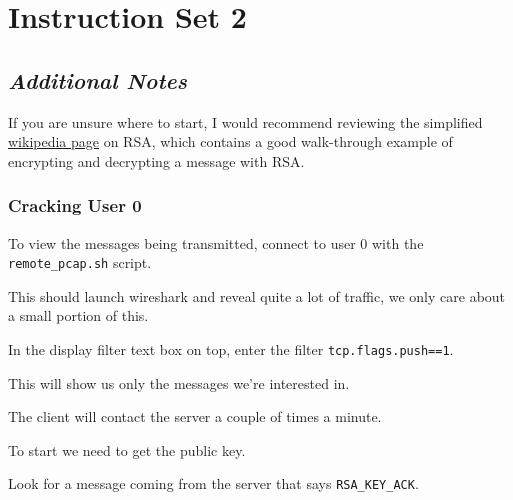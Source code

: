            {\parindent0pt\singlespacing



                \section*{Instruction Set 2}



                    \subsection*{\textit{Additional Notes}}



                        If you are unsure where to start, I would recommend reviewing the simplified \href{https://simple.wikipedia.org/wiki/RSA_algorithm}{wikipedia page} on RSA, which contains a good walk-through example of encrypting and decrypting a message with RSA.







                        \subsubsection*{Cracking User 0}



                            To view the messages being transmitted, connect to user 0 with the \lstinline`remote_pcap.sh` script. 



                            This should launch wireshark and reveal quite a lot of traffic, we only care about a small portion of this.



                            In the display filter text box on top, enter the filter \lstinline`tcp.flags.push==1`. 



                            This will show us only the messages we're interested in.



                            The client will contact the server a couple of times a minute.



                            To start we need to get the public key. 



                            Look for a message coming from the server that says \lstinline`RSA_KEY_ACK`. 



}
